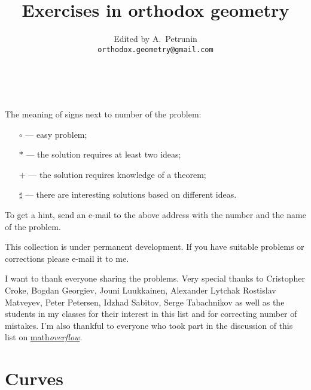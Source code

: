 \documentclass[twoside]{book}
\begin{document}
\title{Exercises in orthodox geometry}
\author{Edited by A.~Petrunin\\
\small{\tt orthodox.geometry@gmail.com}
}

\date{}
\maketitle


\tableofcontents

\ 

 The meaning of signs next to number of the problem:
\begin{itemize}
\item[$\circ$] --- easy problem;%
\item[$*$] --- the solution requires at least two ideas;%
\item[{\small$+$}] --- the solution requires knowledge of a theorem;%
\item[$\sharp$] --- there are interesting solutions based on different ideas.%
\end{itemize}
To get a hint, send an e-mail to the above address 
with the number and the name of the problem.

This collection is under permanent development.
If you have suitable problems or corrections please e-mail it to me.


 I want to thank everyone sharing the problems.
Very special thanks to 
Cristopher Croke,
Bogdan Georgiev,
Jouni Luukkainen,
Alexander Lytchak
Rostislav Matveyev, 
Peter Petersen, 
Idzhad Sabitov,
Serge Tabachnikov 
as well as the students in my classes for their interest in this list and for correcting number of mistakes.
I'm also thankful to everyone who took part in the discussion of this list on \href{http://mathoverflow.net/questions/8247}{math\textit{overflow}}.






\chapter{Curves}
\end{document}
